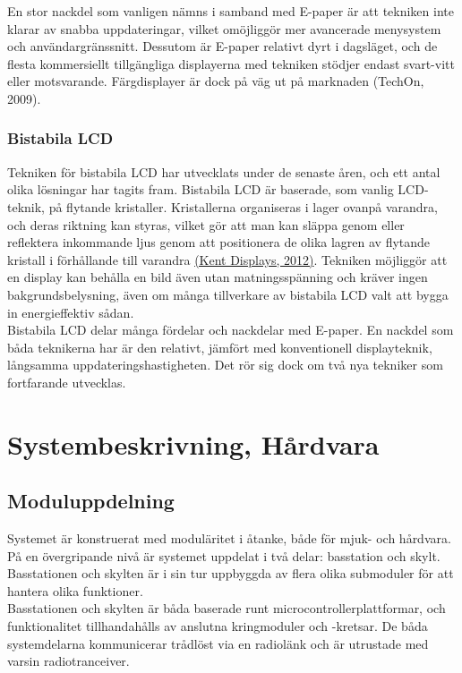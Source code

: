 \documentclass[a4paper,11pt]{article}
\begin{document}
En stor nackdel som vanligen nämns i samband med E-paper är att tekniken inte klarar av snabba uppdateringar, vilket omöjliggör mer avancerade menysystem och användargränssnitt. Dessutom är E-paper relativt dyrt i dagsläget, och de flesta kommersiellt tillgängliga displayerna med tekniken stödjer endast svart-vitt eller motsvarande. Färgdisplayer är dock på väg ut på marknaden (TechOn, 2009).

\subsubsection{Bistabila LCD}
Tekniken för bistabila LCD har utvecklats under de senaste åren, och ett antal olika lösningar har tagits fram. Bistabila LCD är baserade, som vanlig LCD-teknik, på flytande kristaller. Kristallerna organiseras i lager ovanpå varandra, och deras riktning kan styras, vilket gör att man kan släppa genom eller reflektera inkommande ljus genom att positionera de olika lagren av flytande kristall i förhållande till varandra \hyperref[kent]{(Kent Displays, 2012)}. Tekniken möjliggör att en display kan behålla en bild även utan matningsspänning och kräver ingen bakgrundsbelysning, även om många tillverkare av bistabila LCD valt att bygga in energieffektiv sådan. \\

Bistabila LCD delar många fördelar och nackdelar med E-paper. En nackdel som båda teknikerna har är den relativt, jämfört med konventionell displayteknik, långsamma uppdateringshastigheten. Det rör sig dock om två nya tekniker som fortfarande utvecklas.

\section{Systembeskrivning, Hårdvara}

\subsection{Moduluppdelning}
Systemet är konstruerat med moduläritet i åtanke, både för mjuk- och hårdvara. På en övergripande nivå är systemet uppdelat i två delar: basstation och skylt. Basstationen och skylten är i sin tur uppbyggda av flera olika submoduler för att hantera olika funktioner. \\

Basstationen och skylten är båda baserade runt microcontrollerplattformar, och funktionalitet tillhandahålls av anslutna kringmoduler och -kretsar. De båda systemdelarna kommunicerar trådlöst via en radiolänk och är utrustade med varsin radiotranceiver.
\end{document}

